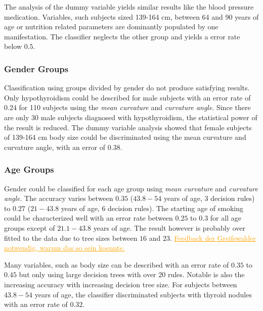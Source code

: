 \documentclass[a4paper,twoside]{style/article}
\newcommand{\com}[1]{\textcolor{orange}{\uline{#1}}}
\begin{document}
The analysis of the dummy variable yields similar results like the blood pressure medication.
Variables, such subjects sized 139-164 cm, between 64 and 90 years of age or nutrition related parameters are dominantly populated by one manifestation.
The classifier neglects the other group and yields a error rate below $0.5$.
\subsubsection{Gender Groups}
Classification using groups divided by gender do not produce satisfying results.
Only hypothyroidism could be described for male subjects with an error rate of $0.24$ for 110 subjects using the \emph{mean curvature} and \emph{curvature angle}.
Since there are only 30 male subjects diagnosed with hypothyroidism, the statistical power of the result is reduced.
The dummy variable analysis showed that female subjects of 139-164 cm body size could be discriminated using the mean curvature and curvature angle, with an error of $0.38$.

\subsubsection{Age Groups}
Gender could be classified for each age group using \emph{mean curvature} and \emph{curvature angle}.
The accuracy varies between $0.35$ ($43.8-54$ years of age, 3 decision rules) to $0.27$ ($21-43.8$ years of age, 6 decision rules).
The starting age of smoking could be characterized well with an error rate between $0.25$ to $0.3$ for all age groups except of $21.1-43.8$ years of age.
The result however is probably over fitted to the data due to tree sizes between $16$ and $23$.
\com{Feedback der Greifswalder notwendig, warum das so sein koennte.}

Many variables, such as body size can be described with an error rate of $0.35$ to $0.45$ but only using large decision trees with over 20 rules.
Notable is also the increasing accuracy with increasing decision tree size.
For subjects between $43.8-54$ years of age, the classifier discriminated subjects with thyroid nodules with an error rate of $0.32$.
\end{document}
